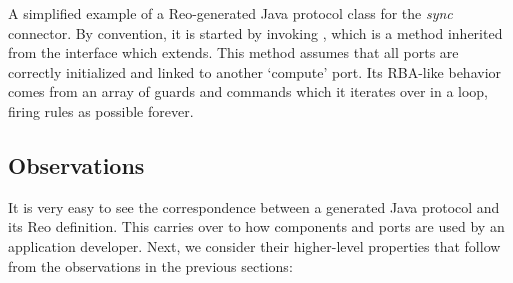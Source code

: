 \begin{listing}[ht]
	\centering
	\inputminted{java}{java_gen_2.java}
	\caption[Reo-generated Java protocol class of the sync connector.]{A simplified example of a Reo-generated Java protocol class for the \textit{sync} connector. By convention, it is started by invoking , which is a method inherited from the  interface which  extends. This method assumes that all ports are correctly initialized and linked to another `compute' port. Its RBA-like behavior comes from an array of guards and commands which it iterates over in a loop, firing rules as possible forever.}
	\label{listing:java_gen_2}
\end{listing}

\subsection{Observations}
\label{sec:java_observations}
It is very easy to see the correspondence between a generated Java protocol and its Reo definition. This carries over to how components and ports are used by an application developer. Next, we consider their higher-level properties that follow from the observations in the previous sections:




